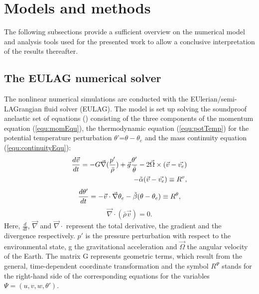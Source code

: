 \section{Models and methods}

The following subsections provide a sufficient overview on the numerical model and analysis tools used for the presented work to allow a conclusive interpretation of the results thereafter.

\subsection{The EULAG numerical solver}
\label{sec:EULAG}

The nonlinear numerical simulations are conducted with the EUlerian/semi- LAGrangian fluid solver (EULAG). The model is set up solving the soundproof anelastic set of equations (\cite{lipps_scale_1982}) consisting of the three components of the momentum equation (\ref{equ:momEqu}), the thermodynamic equation (\ref{equ:potTemp}) for the potential temperature perturbation $\theta$'=$\theta-\theta_e$ and the mass continuity equation (\ref{equ:continuityEqu}):
%
\begin{equation}
\begin{aligned}
    \frac{d \Vec{v}}{dt} = -G \Vec{\nabla} (\frac{p'}{\bar{\rho}}) +  \Vec{g} \frac{\theta'}{\bar{\theta}} - 2 \Vec{\Omega} \times (\Vec{v}-\Vec{v_e}) \\
    - \Tilde{\alpha} (\Vec{v}-\Vec{v_e}) \equiv R^{v},
    \label{equ:momEqu}
\end{aligned}
\end{equation}
%
\begin{equation}
    \frac{d \theta'}{dt} = -\Vec{v} \cdot \Vec{\nabla} \theta_e - \Tilde{\beta} (\theta-\theta_e) \equiv R^{\theta},
    \label{equ:potTemp}
\end{equation}
%
\begin{equation}
    \Vec{\nabla} \cdot (\bar{\rho} \Vec{v}) = 0.
    \label{equ:continuityEqu}
\end{equation}
%
Here, $\frac{d}{dt}$, $\Vec{\nabla}$ and $\Vec{\nabla} \cdot$ represent the total derivative, the gradient and the divergence respectively. $p'$ is the pressure perturbation with respect to the environmental state, g the gravitational acceleration and $\Vec{\Omega}$ the angular velocity of the Earth. The matrix G represents geometric terms, which result from the general, time-dependent coordinate transformation and the symbol $R^{\Psi}$ stands for the right-hand side of the corresponding equations for the variables $\Psi = (u,v,w,\theta')$.
